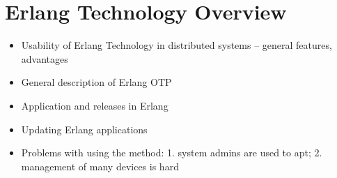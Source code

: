 \section{Erlang Technology Overview}

\begin{itemize}
	\item Usability of Erlang Technology in distributed systems -- general features, advantages
	\item General description of Erlang OTP
	\item Application and releases in Erlang
	\item Updating Erlang applications 
	\item Problems with using the method: 1. system admins are used to apt; 2. management of many devices is hard
\end{itemize}
